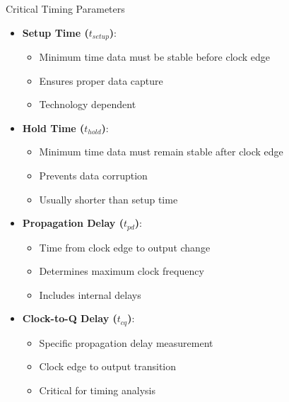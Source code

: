 \documentclass[aspectratio=169,11pt]{beamer}
\newcommand{\concept}[1]{\textbf{\color{accentcolor}#1}}
\begin{document}
\begin{frame}{Critical Timing Parameters}
\begin{itemize}
\item \concept{Setup Time ($t_{setup}$)}:
\begin{itemize}
\item Minimum time data must be stable before clock edge
\item Ensures proper data capture
\item Technology dependent
\end{itemize}
\vspace{0.3cm}
\item \concept{Hold Time ($t_{hold}$)}:
\begin{itemize}
\item Minimum time data must remain stable after clock edge
\item Prevents data corruption
\item Usually shorter than setup time
\end{itemize}
\vspace{0.3cm}
\item \concept{Propagation Delay ($t_{pd}$)}:
\begin{itemize}
\item Time from clock edge to output change
\item Determines maximum clock frequency
\item Includes internal delays
\end{itemize}
\vspace{0.3cm}
\item \concept{Clock-to-Q Delay ($t_{cq}$)}:
\begin{itemize}
\item Specific propagation delay measurement
\item Clock edge to output transition
\item Critical for timing analysis
\end{itemize}
\end{itemize}
\end{frame}
\end{document}
